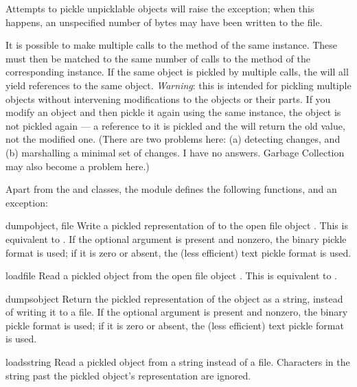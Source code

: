 Attempts to pickle unpicklable objects will raise the
 exception; when this happens, an unspecified
number of bytes may have been written to the file.

It is possible to make multiple calls to the  method of
the same  instance.  These must then be matched to the
same number of calls to the  method of the
corresponding  instance.  If the same object is
pickled by multiple  calls, the  will all
yield references to the same object.  \emph{Warning}: this is intended
for pickling multiple objects without intervening modifications to the
objects or their parts.  If you modify an object and then pickle it
again using the same  instance, the object is not
pickled again --- a reference to it is pickled and the
 will return the old value, not the modified one.
(There are two problems here: (a) detecting changes, and (b)
marshalling a minimal set of changes.  I have no answers.  Garbage
Collection may also become a problem here.)

Apart from the  and  classes, the
module defines the following functions, and an exception:

\begin{funcdesc}{dump}{object, file}
Write a pickled representation of  to the open file object
.  This is equivalent to
.
If the optional  argument is present and nonzero, the binary
pickle format is used; if it is zero or absent, the (less efficient)
text pickle format is used.
\end{funcdesc}

\begin{funcdesc}{load}{file}
Read a pickled object from the open file object .  This is
equivalent to .
\end{funcdesc}

\begin{funcdesc}{dumps}{object}
Return the pickled representation of the object as a string, instead
of writing it to a file.  If the optional  argument is
present and nonzero, the binary pickle format is used; if it is zero
or absent, the (less efficient) text pickle format is used.
\end{funcdesc}

\begin{funcdesc}{loads}{string}
Read a pickled object from a string instead of a file.  Characters in
the string past the pickled object's representation are ignored.
\end{funcdesc}

